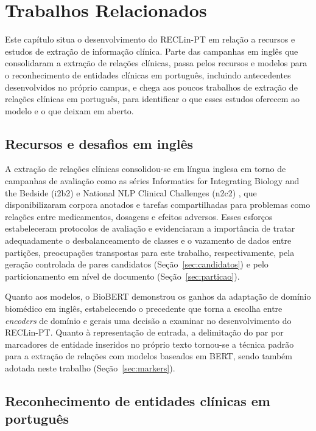 \chapter[Trabalhos Relacionados]{Trabalhos Relacionados}
\label{cap:relacionados}

Este capítulo situa o desenvolvimento do RECLin-PT em relação a recursos e estudos de
extração de informação clínica. Parte das campanhas em inglês que consolidaram a
extração de relações clínicas, passa pelos recursos e modelos para o reconhecimento
de entidades clínicas em português, incluindo antecedentes desenvolvidos no próprio
campus, e chega aos poucos trabalhos de extração de relações clínicas em português,
para identificar o que esses estudos oferecem ao modelo e o que deixam em aberto.

\section{Recursos e desafios em inglês}

A extração de relações clínicas consolidou-se em língua inglesa em torno de
campanhas de avaliação como as séries \foreignlanguage{english}{Informatics for
Integrating Biology and the Bedside} (i2b2) e \foreignlanguage{english}{National
NLP Clinical Challenges} (n2c2) \cite{uzuner_2011_i2b2}, que disponibilizaram
corpora anotados e tarefas compartilhadas para problemas como relações entre
medicamentos, dosagens e efeitos adversos. Esses esforços estabeleceram protocolos
de avaliação e evidenciaram a importância de tratar adequadamente o desbalanceamento
de classes e o vazamento de dados entre partições, preocupações transpostas para
este trabalho, respectivamente, pela geração controlada de pares candidatos
(Seção~\ref{sec:candidatos}) e pelo particionamento em nível de documento
(Seção~\ref{sec:particao}).

Quanto aos modelos, o BioBERT \cite{lee_2020_biobert} demonstrou os
ganhos da adaptação de domínio biomédico em inglês, estabelecendo o precedente que
torna a escolha entre \emph{encoders} de domínio e gerais uma decisão a examinar no
desenvolvimento do RECLin-PT. Quanto à representação de entrada,
a delimitação do par por marcadores de entidade inseridos no próprio texto
\cite{soares_2019_markers} tornou-se a técnica padrão para a extração de relações com modelos baseados em \foreignlanguage{english}{BERT}, sendo também adotada neste trabalho
(Seção~\ref{sec:markers}).

\section{Reconhecimento de entidades clínicas em português}
\label{sec:recursos_pt}

